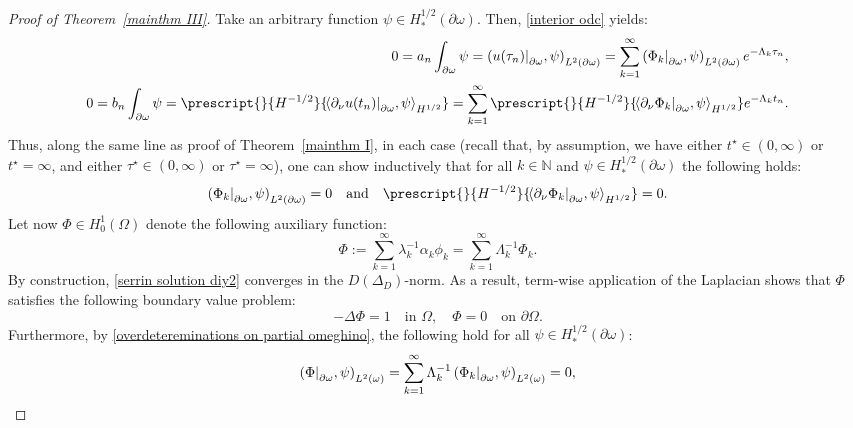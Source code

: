 \documentclass[a4paper,11pt]{article}
\newcommand\restr[2]{{%
\left.\kern-\nulldelimiterspace %
#1 %
\vphantom{|} %
\right|_{#2} %
}}
\newcommand{\Pairing}[2]{
 \prescript{}{{H^{-1/2}}}{\!\left\langle #1, #2\right\rangle_{H^{1/2}}}
 } %
\newcommand{\om}{\omega}
\numberwithin{equation}{section}
\begin{document}
\begin{proof}[Proof of Theorem~\ref{mainthm III}]
Take an arbitrary function $\psi\in H_*^{1/2}(\partial\omega)$. Then, \eqref{interior odc} yields:
\begin{equation*}
\begin{aligned}
0=a_n \int_{\partial\omega} \psi = \left(\restr{u(\tau_n)}{\partial\omega},\psi\right)_{L^2(\partial\om)}=\sum_{k=1}^\infty \left(\restr{\Phi_k}{\partial\omega},\psi \right)_{L^2(\partial\omega)} e^{-\Lambda_k \tau_n},\\
0=b_n \int_{\partial\omega} \psi = 
 \Pairing{\partial_\nu \restr{u(t_n)}{\partial\omega}}{\psi}=
\sum_{k=1}^\infty \Pairing{\partial_\nu \restr{\Phi_k}{\partial\omega}}{\psi} e^{-\Lambda_k t_n}.
\end{aligned}
\end{equation*}
Thus, along the same line as proof of Theorem~\ref{mainthm I}, in each case (recall that, by assumption, we have either $t^\star\in (0,\infty)$ or $t^\star=\infty$, and either $\tau^\star\in (0,\infty)$ or $\tau^\star=\infty$), one can show inductively that for all $k\in \mathbb{N}$ and $\psi\in H_*^{1/2}(\partial\om)$ the following holds:
\begin{equation}\label{overdetereminations on partial omeghino}
    \left(\restr{\Phi_k}{\partial\omega},\psi\right)_{L^2(\partial\omega)}=0\quad \text{and} \quad \Pairing{\partial_\nu \restr{\Phi_k}{\partial\omega}}{\psi}=0.
\end{equation}
Let now $\Phi\in H_0^1(\Omega)$ denote the following auxiliary function:
\begin{equation}\label{serrin solution diy2}
    \Phi:=\sum_{k=1}^\infty \lambda_k^{-1}\alpha_k \phi_k=
    \sum_{k=1}^\infty \Lambda_k^{-1}\Phi_k.
\end{equation}
By construction, \eqref{serrin solution diy2} converges in the $D(\Delta_D)$-norm. As a result, term-wise application of the Laplacian shows that $\Phi$ satisfies the following boundary value problem:
\begin{equation}\label{non overdeteremined bvp}
    -\Delta\Phi = 1 \quad \text{in }\Omega, \quad \Phi=0\quad \text{on }\partial\Omega.
\end{equation}
Furthermore, by \eqref{overdetereminations on partial omeghino}, the following hold for all $\psi\in H_*^{1/2}(\partial\omega)$: 
\begin{eqnarray}\label{first one}
 \left(\restr{\Phi}{\partial\omega}, \psi\right)_{L^2(\omega)}= \sum_{k=1}^\infty \Lambda_k^{-1} \left(\restr{\Phi_k}{\partial\omega}, \psi \right)_{L^2(\omega)}=0,\\

\end{eqnarray}
\end{proof}
\end{document}
